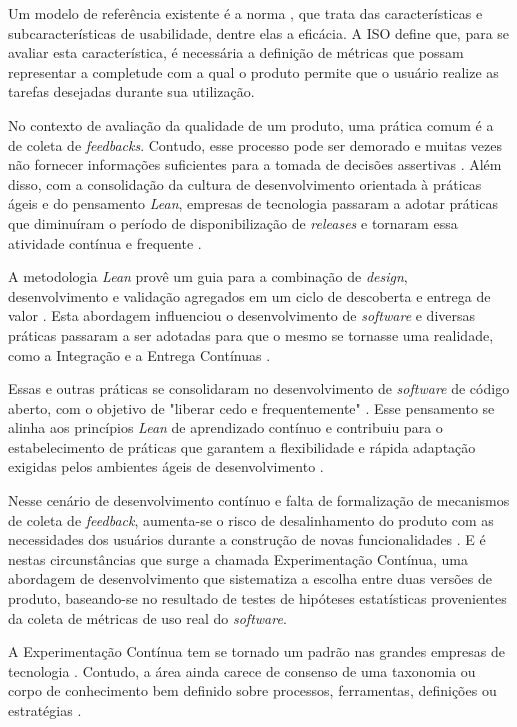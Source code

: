 Um modelo de referência existente é a norma , que trata das características e subcaracterísticas de usabilidade, dentre elas a eficácia. A ISO define que, para se avaliar esta característica, é necessária a definição de métricas que possam representar a completude com a qual o produto permite que o usuário realize as tarefas desejadas durante sua utilização.

No contexto de avaliação da qualidade de um produto, uma prática comum é a de coleta de \textit{feedbacks}. Contudo, esse processo pode ser demorado e muitas vezes não fornecer informações suficientes para a tomada de decisões assertivas \cite{olsson_opinions_2014}. Além disso, com a consolidação da cultura de desenvolvimento orientada à práticas ágeis e do pensamento \textit{Lean}, empresas de tecnologia passaram a adotar práticas que diminuíram o período de disponibilização de \textit{releases} e tornaram essa atividade contínua e frequente \cite{kevic_characterizing_2017}.

A metodologia \textit{Lean} provê um guia para a combinação de \textit{design}, desenvolvimento e validação agregados em um ciclo de descoberta e entrega de valor \cite{fagerholm_right_2017}. Esta abordagem influenciou o desenvolvimento de \textit{software} e diversas práticas passaram a ser adotadas para que o mesmo se tornasse uma realidade, como a Integração e a Entrega Contínuas \cite{fitzgerald2015continuous}.

Essas e outras práticas se consolidaram no desenvolvimento de \textit{software} de código aberto, com o objetivo de "liberar cedo e frequentemente" \cite{feller2005perspectives}. Esse pensamento se alinha aos princípios \textit{Lean} de aprendizado contínuo e contribuiu para o estabelecimento de práticas que garantem a flexibilidade e rápida adaptação exigidas pelos ambientes ágeis de desenvolvimento \cite{fitzgerald2015continuous}.

Nesse cenário de desenvolvimento contínuo e falta de formalização de mecanismos de coleta de \textit{feedback}, aumenta-se o risco de desalinhamento do produto com as necessidades dos usuários durante a construção de novas funcionalidades \cite{olsson2013data}. E é nestas circunstâncias que surge a chamada Experimentação Contínua, uma abordagem de desenvolvimento que sistematiza a escolha entre duas versões de produto, baseando-se no resultado de testes de hipóteses estatísticas provenientes da coleta de métricas de uso real do \textit{software}.

A Experimentação Contínua tem se tornado um padrão nas grandes empresas de tecnologia \cite{kohavi_seven_2014}. Contudo, a área ainda carece de consenso de uma taxonomia ou corpo de conhecimento bem definido sobre processos, ferramentas, definições ou estratégias \cite{erthal_characterization_2023}.

